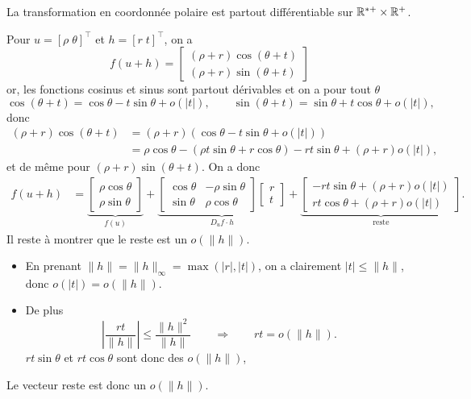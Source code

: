 \begin{proposition} \label{prop:differentiabiliteCoordonneesPolaires}
  La transformation en coordonnée polaire est partout différentiable sur $\mathbb{R}^{*+} \times \mathbb{R}^+$.
\end{proposition}

\proof
Pour $u = [\rho \; \theta]^\top$ et $h = [r \; t ]^\top$, on a
$$
f(u+h) = \left[\begin{array}{c} 
    (\rho+r) \cos(\theta +t) \\ (\rho+r) \sin(\theta +t) 
    \end{array} \right]
$$
or, les fonctions cosinus et sinus sont partout dérivables et on a pour tout $\theta$
$$
\cos(\theta +t) = \cos \theta - t \sin \theta + o(|t|), \qquad 
\sin(\theta +t) = \sin \theta + t \cos \theta + o(|t|),
$$
donc
\begin{align*}
  (\rho+r) \cos(\theta +t) 
    & = (\rho+r)\left(\cos \theta - t \sin \theta + o(|t|)\right) \\
    & = \rho \cos \theta - \left(\rho t \sin \theta + r \cos \theta\right)
    - rt \sin \theta + (\rho + r) o(|t|),
\end{align*}
et de même pour $(\rho+r) \sin(\theta +t)$.
On a donc
\begin{align*}
  f(u+h) 
  & =
  \underset{f(u)}{\underbrace{\left[\begin{array}{c}
    \rho \cos \theta \\ \rho \sin \theta
  \end{array} \right]}}
  +
  \underset{D_u f \cdot h}{\underbrace{\left[\begin{array}{rr} 
          \cos \theta & - \rho \sin \theta \\
          \sin \theta & \rho \cos \theta 
        \end{array} \right]
  \left[\begin{array}{c} r \\ t \end{array} \right]}}
  +
  \underset{\text{reste}}{\underbrace{\left[\begin{array}{r} 
          - rt \sin \theta + (\rho + r) o(|t|) \\
          rt \cos \theta + (\rho + r) o(|t|) 
        \end{array} \right]}}.
\end{align*}
Il reste à montrer que le reste est un $o(\|h\|)$. 
\begin{itemize}
  \item En prenant $\|h\| = \|h\|_\infty = \max(|r|, |t|)$, on a clairement $|t| \leq \|h\|$, donc $o(|t|) = o(\|h\|)$. 
  \item De plus
  $$
  \left|\frac{rt}{\|h\|}\right| 
  \leq \frac{\|h\|^2}{\|h\|}
  \qquad \Rightarrow \qquad 
  rt = o(\|h\|).
  $$
  $rt \sin \theta$ et $rt \cos \theta$ sont donc des $o(\|h\|)$, 
\end{itemize}
Le vecteur reste est donc un $o(\|h\|)$.
\eproof

